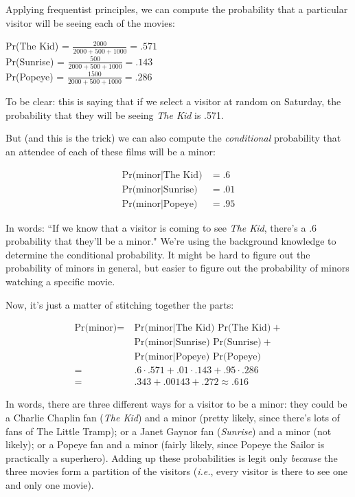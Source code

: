 Applying frequentist principles, we can compute the probability that a
particular visitor will be seeing each of the movies:

\begin{center}
Pr(The Kid) = $\frac{2000}{2000+500+1000} = .571$ \\[.1in]
Pr(Sunrise) = $\frac{500}{2000+500+1000} = .143$\\[.1in]
Pr(Popeye) = $\frac{1500}{2000+500+1000} = .286$
\end{center}

To be clear: this is saying that if we select a visitor at random on
Saturday, the probability that they will be seeing \textit{The Kid} is .571.

But (and this is the trick) we can also compute the \textit{conditional}
probability that an attendee of each of these films will be a minor:

\begin{align*}
\text{Pr(minor}|\text{The Kid)} &= .6 \\
\text{Pr(minor}|\text{Sunrise)} &= .01 \\
\text{Pr(minor}|\text{Popeye)} &= .95
\end{align*}

In words: ``If we know that a visitor is coming to see \textit{The Kid}, there's a .6
probability that they'll be a minor." We're using the background knowledge to
determine the conditional probability. It might be hard to figure out the
probability of minors in general, but easier to figure out the probability of
minors watching a specific movie.

Now, it's just a matter of stitching together the parts:

\begin{align*}
\text{Pr(minor)} = &\ \text{Pr(minor}|\text{The Kid) Pr(The Kid)} +  \\
&\ \text{Pr(minor}|\text{Sunrise) Pr(Sunrise)} +  \\
&\ \text{Pr(minor}|\text{Popeye) Pr(Popeye)}\\
= &\ .6 \cdot .571 + .01 \cdot .143 + .95 \cdot .286 \\
= &\ .343 + .00143 + .272 \approx .616
\end{align*}

In words, there are three different ways for a visitor to be a minor: they
could be a Charlie Chaplin fan (\textit{The Kid}) and a minor (pretty likely, since there's lots of
fans of The Little Tramp); or a Janet Gaynor fan (\textit{Sunrise}) and a minor (not likely); or a Popeye
fan and a minor (fairly likely, since Popeye the Sailor is practically a superhero). Adding up these probabilities is
legit only \textit{because} the three movies form a partition of the
visitors (\textit{i.e.}, every visitor is there to see one and only one
movie).

